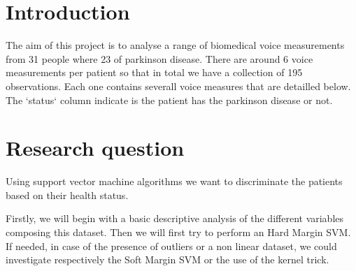 \section{Introduction}

The aim of this project is to analyse a range of biomedical voice measurements from 31 people where 23 of parkinson disease. There are around 6 voice measurements per patient so that in total we have a collection of 195 observations. Each one contains severall voice measures that are detailled below. The `status` column indicate is the patient has the parkinson disease or not.

\section{Research question}

Using support vector machine algorithms we want to discriminate the patients based on their health status.

Firstly, we will begin with a basic descriptive analysis of the different variables composing this dataset. Then we will first try to perform an Hard Margin SVM. If needed, in case of the presence of outliers or a non linear dataset, we could investigate respectively the Soft Margin SVM or the use of the kernel trick.